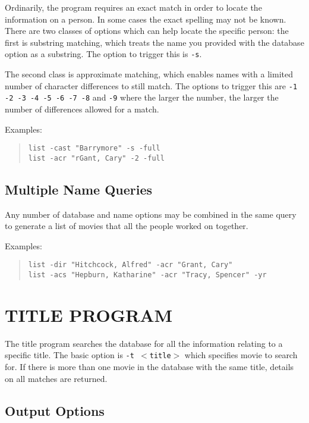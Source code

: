 Ordinarily, the program requires an exact match in order to locate the 
information on a person. In some cases the exact spelling may not be known.
There are two classes of options which can help locate the specific person:
the first is substring matching, which treats the name you provided with 
the 
database option as a substring. The option to trigger this is {\tt -s}. 

The second class is approximate matching, which enables names with a 
limited 
number of character differences to still match. The options to trigger 
this 
are {\tt -1 -2 -3 -4 -5 -6 -7 -8} and {\tt -9} where the larger the 
number, 
the larger the number of differences allowed for a match. 

Examples:
\begin{quote}
{\tt list -cast "Barrymore" -s -full}\\
{\tt list -acr "rGant, Cary" -2 -full}
\end{quote}

\subsection{Multiple Name Queries}

Any number of database and name options may be combined in the same query
to generate a list of movies that all the people worked on together. 

Examples:
\begin{quote}
{\tt list -dir "Hitchcock, Alfred" -acr "Grant, Cary"}\\
{\tt list -acs "Hepburn, Katharine" -acr "Tracy, Spencer" -yr}
\end{quote}

\clearpage
\section{TITLE PROGRAM}

The title program searches the database for all the information relating
to a specific title. The basic option is {\tt -t $<$title$>$} which 
specifies 
movie to search for. If there is more than one movie in the database with
the same title, details on all matches are returned.

\subsection{Output Options}

